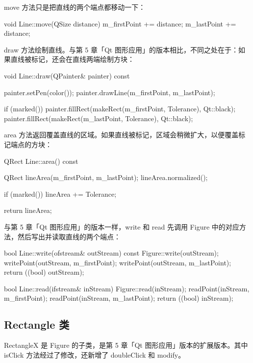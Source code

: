 move 方法只是把直线的两个端点都移动一下：

\begin{codebox}
void Line::move(QSize distance) {
  m_firstPoint += distance;
  m_lastPoint += distance;
}
\end{codebox}

draw 方法绘制直线。与第 5 章「Qt 图形应用」的版本相比，不同之处在于：如果直线被标记，还会在直线两端绘制方块：

\begin{codebox}
void Line::draw(QPainter& painter) const {
  painter.setPen(color());
  painter.drawLine(m_firstPoint, m_lastPoint);

  if (marked()) {
    painter.fillRect(makeRect(m_firstPoint, Tolerance),
                     Qt::black);
    painter.fillRect(makeRect(m_lastPoint, Tolerance),
                     Qt::black);
  }
}
\end{codebox}

area 方法返回覆盖直线的区域。如果直线被标记，区域会稍微扩大，以便覆盖标记端点的方块：

\begin{codebox}
QRect Line::area() const {
  QRect lineArea(m_firstPoint, m_lastPoint);
  lineArea.normalized();

  if (marked()) {
     lineArea += Tolerance;
  }

  return lineArea;
}
\end{codebox}

与第 5 章「Qt 图形应用」的版本一样，write 和 read 先调用 Figure 中的对应方法，然后写出并读取直线的两个端点：

\begin{codebox}
bool Line::write(ofstream& outStream) const {
  Figure::write(outStream);
  writePoint(outStream, m_firstPoint);
  writePoint(outStream, m_lastPoint);
  return ((bool) outStream);
}

bool Line::read(ifstream& inStream) {
  Figure::read(inStream);
  readPoint(inStream, m_firstPoint);
  readPoint(inStream, m_lastPoint);
  return ((bool) inStream);
}
\end{codebox}

\subsection{Rectangle 类}

RectangleX 是 Figure 的子类，是第 5 章「Qt 图形应用」版本的扩展版本。其中 isClick 方法经过了修改，还新增了 doubleClick 和 modify。

